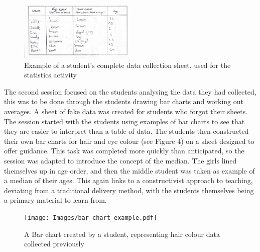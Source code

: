 \documentclass[11pt, a4paper, notitlepage]{article}
\begin{document}
\begin{figure}[htbp]
    \centering
    \includegraphics[width=0.5\textwidth]{Images/data_collection_example.pdf}
    \caption{Example of a student's complete data collection sheet, used for the statistics activity}
\end{figure}

\par
\vspace{1em}
The second session focused on the students analysing the data they had collected, this was to be done through the students drawing bar charts and working out averages. A sheet of fake data was created for students who forgot their sheets. The session started with the students using examples of bar charts to see that they are easier to interpret than a table of data. The students then constructed their own bar charts for hair and eye colour (see Figure 4) on a sheet designed to offer guidance. This task was completed more quickly than anticipated, so the session was adapted to introduce the concept of the  median. The girls lined themselves up in age order, and then the middle student was taken as example of a median of their ages. This again links to a constructivist approach to teaching, deviating from a traditional delivery method, with the students themselves being a primary material to learn from.

\begin{figure}[htbp]
    \centering
    \texttt{[image: Images/bar\_chart\_example.pdf]}
    \caption{A Bar chart created by a student, representing hair colour data collected previously}
\end{figure}
\end{document}
